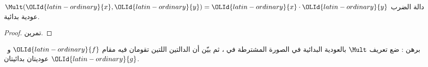 \documentclass[../../../include/open-logic-section]{subfiles}
\begin{document}
\begin{prop}
  دالة الضرب $\Mult({\OLId{latin-ordinary}{x}},{\OLId{latin-ordinary}{y}})={\OLId{latin-ordinary}{x}}\cdot {\OLId{latin-ordinary}{y}}$ عودية بدائية.
\end{prop}

\begin{proof}
  تمرين.
\end{proof}

\begin{prob}
  برهن : ضع تعريف $\Mult$
  بالعودية البدائية في الصورة المشترطة في
  ، ثم بيّن أن الدالتين
  اللتين تقومان فيه مقام ${\OLId{latin-ordinary}{f}}$ و~${\OLId{latin-ordinary}{g}}$ عوديتان بدائيتان.
\end{prob}
\end{document}

